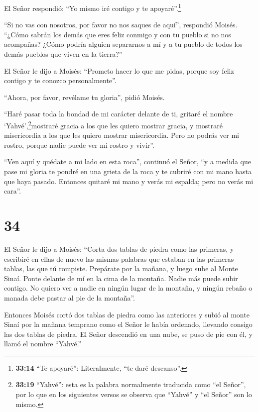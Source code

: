  El Señor respondió: ``Yo mismo iré contigo y te
apoyaré''.\footnote{\textbf{33:14} ``Te apoyaré'': Literalmente, ``te
  daré descanso''.}

 ``Si no vas con nosotros, por favor no nos saques de
aquí'', respondió Moisés.  ``¿Cómo sabrán los demás que
eres feliz conmigo y con tu pueblo si no nos acompañas? ¿Cómo podría
alguien separarnos a mí y a tu pueblo de todos los demás pueblos que
viven en la tierra?''

 El Señor le dijo a Moisés: ``Prometo hacer lo que me
pidas, porque soy feliz contigo y te conozco personalmente''.

 ``Ahora, por favor, revélame tu gloria'', pidió Moisés.

 ``Haré pasar toda la bondad de mi carácter delante de ti,
gritaré el nombre `Yahvé',\footnote{\textbf{33:19} ``Yahvé'': esta es la
  palabra normalmente traducida como ``el Señor'', por lo que en los
  siguientes versos se observa que ``Yahvé'' y ``el Señor'' son lo
  mismo.}mostraré gracia a los que les quiero mostrar gracia, y mostraré
misericordia a los que les quiero mostrar misericordia. 
Pero no podrás ver mi rostro, porque nadie puede ver mi rostro y
vivir''.

 ``Ven aquí y quédate a mi lado en esta roca'', continuó el
Señor,  ``y a medida que pase mi gloria te pondré en una
grieta de la roca y te cubriré con mi mano hasta que haya pasado.
 Entonces quitaré mi mano y verás mi espalda; pero no verás
mi cara''.

\hypertarget{section-33}{%
\section{34}\label{section-33}}

 El Señor le dijo a Moisés: ``Corta dos tablas de piedra
como las primeras, y escribiré en ellas de nuevo las mismas palabras que
estaban en las primeras tablas, las que tú rompiste. 
Prepárate por la mañana, y luego sube al Monte Sinaí. Ponte delante de
mí en la cima de la montaña.  Nadie más puede subir contigo.
No quiero ver a nadie en ningún lugar de la montaña, y ningún rebaño o
manada debe pastar al pie de la montaña''.

 Entonces Moisés cortó dos tablas de piedra como las
anteriores y subió al monte Sinaí por la mañana temprano como el Señor
le había ordenado, llevando consigo las dos tablas de piedra.
 El Señor descendió en una nube, se puso de pie con él, y
llamó el nombre ``Yahvé.''

